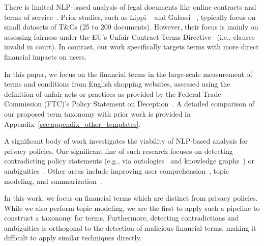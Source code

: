 There is limited NLP-based analysis of legal documents like online contracts and terms of service~\citep{lagioia2017automated, braun2021nlp, lippi2019claudette, limsopatham2021effectively, jablonowska2021assessing, galassi2024unfair}. Prior studies, such as Lippi \etal~\citep{lippi2019claudette} and Galassi \etal~\citep{galassi2024unfair}, typically focus on small datasets of T\&Cs (25 to 200 documents). However, their focus is mainly on assessing fairness under the EU’s Unfair Contract Terms Directive~\citep{CouncilDirective1993} (i.e., clauses invalid in court). In contrast, our work specifically targets terms with more direct financial impacts on users.


In this paper, we focus on the financial terms in the large-scale measurement of terms and conditions from English shopping websites, assessed using the definition of unfair acts or practices as provided by the Federal Trade Commission (FTC)'s Policy Statement on Deception~\citep{ftc1983deception}. A detailed comparison of our proposed term taxonomy with prior work is provided in Appendix~\ref{sec:appendix_other_templates}.

A significant body of work investigates the viability of NLP-based analysis for privacy policies. One significant line of such research focuses on detecting contradicting policy statements (e.g., via ontologies~\citep{andow2019policylint} and knowledge graphs~\citep{cui2023poligraph}) or ambiguities~\citep{shvartzshnaider2019going}. Other areas include improving user comprehension~\citep{harkous2018polisis}, topic modeling, and summarization~\citep{alabduljabbar2021automated, sarne2019unsupervised}.

In this work, we focus on financial terms which are distinct from privacy policies. While we also perform topic modeling, we are the first to apply such a pipeline to construct a taxonomy for \termname terms. Furthermore, detecting contradictions and ambiguities is orthogonal to the detection of malicious financial terms, making it difficult to apply similar techniques directly.